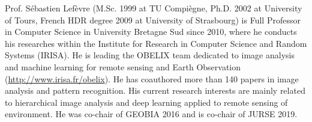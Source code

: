 \documentclass[journal]{IEEEtran}
\begin{document}
Prof. S{\'e}bastien Lef{\`e}vre (M.Sc. 1999 at TU Compi{\`e}gne, Ph.D. 2002 at University of Tours, French HDR degree 2009 at University of Strasbourg) is Full Professor in Computer Science in University Bretagne Sud since 2010, where he conducts his researches within the Institute for Research in Computer Science and Random Systems (IRISA). He is leading the OBELIX team dedicated to image analysis and machine learning for remote sensing and Earth Observation (\url{http://www.irisa.fr/obelix}). He has coauthored more than 140 papers in image analysis and pattern recognition. His current research interests are mainly related to hierarchical image analysis and deep learning applied to remote sensing of environment. He was co-chair of GEOBIA 2016 and is co-chair of JURSE 2019.
\end{document}
